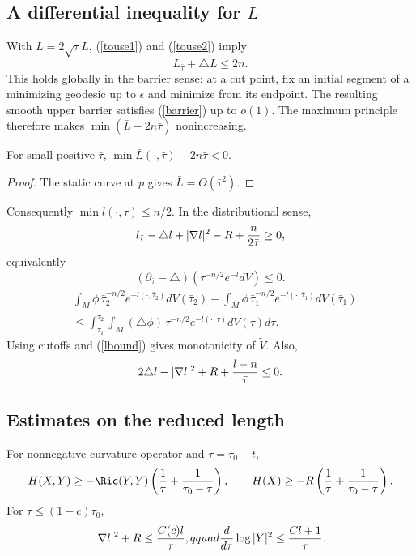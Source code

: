 \subsection{A differential inequality for $L$} \label{I.(7.15)}
With $\bar L=2\sqrt\tau L$, (\ref{touse1}) and (\ref{touse2}) imply
\begin{equation}\label{barrier}\bar L_{\bar\tau}+\triangle\bar L\le2n.
\end{equation}
This holds globally in the barrier sense: at a cut point, fix an initial segment
of a minimizing geodesic up to $\epsilon$ and minimize from its endpoint. The resulting
smooth upper barrier satisfies (\ref{barrier}) up to $o(1)$. The maximum principle
therefore makes $\min(\bar L-2n\bar\tau)$ nonincreasing.
\begin{lemma}
  \label{lem:kl-reduced-l-geometry-positivity-reduced-l-geometry}
  \label{neg}
For small positive $\bar\tau$, $\min\bar L(\cdot,\bar\tau)-2n\bar\tau<0$.
\end{lemma}
\begin{proof}
\sketch
The static curve at $p$ gives $\bar L=O(\bar\tau^2)$.
\end{proof}
Consequently $\min l(\cdot,\tau)\le n/2$. In the distributional sense,
\begin{equation}
l_{\bar\tau}-\triangle l+|\nabla l|^2-R+{n\over2\bar\tau}\ge0,
\end{equation}
equivalently
\begin{equation}\label{illustrate}(\partial_{\bar\tau}-\triangle)(\tau^{-n/2}e^{-l}dV)\le0.
\end{equation}
\begin{align}\label{pphieqn}
&\int_M\phi\,\bar\tau_2^{-n/2}e^{-l(\cdot,\bar\tau_2)}dV(\bar\tau_2)
-\int_M\phi\,\bar\tau_1^{-n/2}e^{-l(\cdot,\bar\tau_1)}dV(\bar\tau_1)\\
&\le\int_{\bar\tau_1}^{\bar\tau_2}\int_M(\triangle\phi)\,
\tau^{-n/2}e^{-l(\cdot,\tau)}dV(\tau)d\tau.
\end{align}
Using cutoffs and (\ref{lbound}) gives monotonicity of $\tilde V$. Also,
\begin{equation}\label{illustrate2}2\triangle l-|\nabla l|^2+R+{l-n\over\bar\tau}\le0.\end{equation}

\subsection{Estimates on the reduced length}
For nonnegative curvature operator and $\tau=\tau_0-t$,
\begin{equation}\label{ineqtoshow}H(X,Y)\ge-\Ric(Y,Y)\left({1\over\tau}+{1\over\tau_0-\tau}\right),\qquad
H(X)\ge-R\left({1\over\tau}+{1\over\tau_0-\tau}\right).
\end{equation}
For $\tau\le(1-c)\tau_0$,
\begin{equation}\label{I.(7.16)}|\nabla l|^2+R\le {C(c)l\over\tau},qquad
{d\over d\tau}\log|Y|^2\le {Cl+1\over\tau}.
\end{equation}

